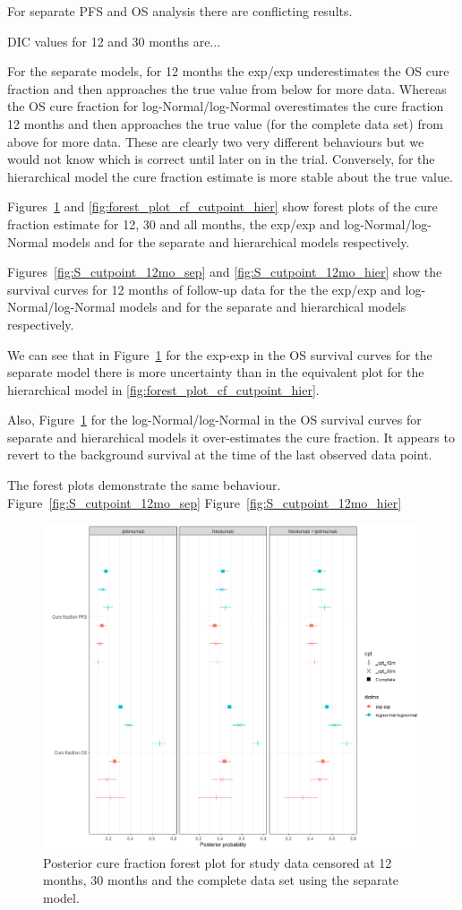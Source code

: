 \documentclass[AMA,STIX1COL]{WileyNJD-v2}
\begin{document}
For separate PFS and OS analysis there are conflicting results.

DIC values for 12 and 30 months are...

For the separate models, for 12 months the exp/exp underestimates the OS cure fraction and then approaches the true value from below for more data.
Whereas the OS cure fraction for log-Normal/log-Normal overestimates the cure fraction 12 months and then approaches the true value (for the complete data set) from above for more data.
These are clearly two very different behaviours but we would not know which is correct until later on in the trial.
Conversely, for the hierarchical model the cure fraction estimate is more stable about the true value.

Figures~\ref{fig:forest_plot_cf_cutpoint_sep} and \ref{fig:forest_plot_cf_cutpoint_hier} show forest plots of the cure fraction estimate for 12, 30 and all months, the exp/exp and log-Normal/log-Normal models and for the separate and hierarchical models respectively.

Figures~\ref{fig:S_cutpoint_12mo_sep} and \ref{fig:S_cutpoint_12mo_hier} show
the survival curves for 12 months of follow-up data for the the exp/exp and log-Normal/log-Normal models and for the separate and hierarchical models respectively.

We can see that in Figure~\ref{fig:forest_plot_cf_cutpoint_sep} for the exp-exp in the OS survival curves for the separate model there is more uncertainty than in the equivalent plot for the hierarchical model in \ref{fig:forest_plot_cf_cutpoint_hier}.

Also, Figure~\ref{fig:forest_plot_cf_cutpoint_sep} for the log-Normal/log-Normal in the OS survival curves for separate and hierarchical models it over-estimates the cure fraction. It appears to revert to the background survival at the time of the last observed data point.

The forest plots demonstrate the same behaviour.
Figure~\ref{fig:S_cutpoint_12mo_sep}
Figure~\ref{fig:S_cutpoint_12mo_hier}


\begin{figure}[!H]
\centering
\includegraphics[width=0.6\linewidth]{forest_plot_cf_sep_cpt.png}
\caption{\label{fig:forest_plot_cf_cutpoint_sep} Posterior cure fraction forest plot for study data censored at 12 months, 30 months and the complete data set using the separate model.}
\end{figure}
\end{document}
